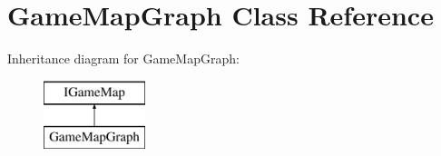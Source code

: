 \hypertarget{class_game_map_graph}{}\section{Game\+Map\+Graph Class Reference}
\label{class_game_map_graph}
Inheritance diagram for Game\+Map\+Graph\+:\begin{figure}[H]
\begin{center}
\leavevmode
\includegraphics[height=2.000000cm]{class_game_map_graph}
\end{center}
\end{figure}
